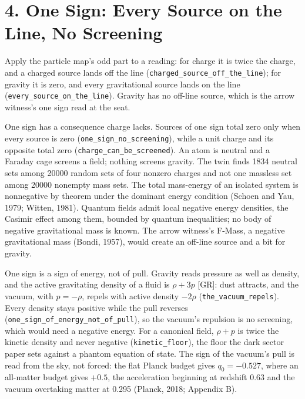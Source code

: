 \documentclass[10pt]{article}
\begin{document}
\hypertarget{one-sign-every-source-on-the-line-no-screening}{%
\section{4. One Sign: Every Source on the Line, No
Screening}\label{one-sign-every-source-on-the-line-no-screening}}

Apply the particle map's odd part to a reading: for charge it is twice
the charge, and a charged source lands off the line
(\texttt{charged\_source\_off\_the\_line}); for gravity it is zero, and
every gravitational source lands on the line
(\texttt{every\_source\_on\_the\_line}). Gravity has no off-line source,
which is the arrow witness's one sign read at the seat.

One sign has a consequence charge lacks. Sources of one sign total zero
only when every source is zero (\texttt{one\_sign\_no\_screening}),
while a unit charge and its opposite total zero
(\texttt{charge\_can\_be\_screened}). An atom is neutral and a Faraday
cage screens a field; nothing screens gravity. The twin finds 1834
neutral sets among 20000 random sets of four nonzero charges and not one
massless set among 20000 nonempty mass sets. The total mass-energy of an
isolated system is nonnegative by theorem under the dominant energy
condition (Schoen and Yau, 1979; Witten, 1981). Quantum fields admit
local negative energy densities, the Casimir effect among them, bounded
by quantum inequalities; no body of negative gravitational mass is
known. The arrow witness's F-Mass, a negative gravitational mass (Bondi,
1957), would create an off-line source and a bit for gravity.

One sign is a sign of energy, not of pull. Gravity reads pressure as
well as density, and the active gravitating density of a fluid is
\(\rho+3p\) {[}GR{]}: dust attracts, and the vacuum, with \(p=-\rho\),
repels with active density \(-2\rho\) (\texttt{the\_vacuum\_repels}).
Every density stays positive while the pull reverses
(\texttt{one\_sign\_of\_energy\_not\_of\_pull}), so the vacuum's
repulsion is no screening, which would need a negative energy. For a
canonical field, \(\rho+p\) is twice the kinetic density and never
negative (\texttt{kinetic\_floor}), the floor the dark sector paper sets
against a phantom equation of state. The sign of the vacuum's pull is
read from the sky, not forced: the flat Planck budget gives
\(q_0=-0.527\), where an all-matter budget gives \(+0.5\), the
acceleration beginning at redshift 0.63 and the vacuum overtaking matter
at 0.295 (Planck, 2018; Appendix B).
\end{document}
